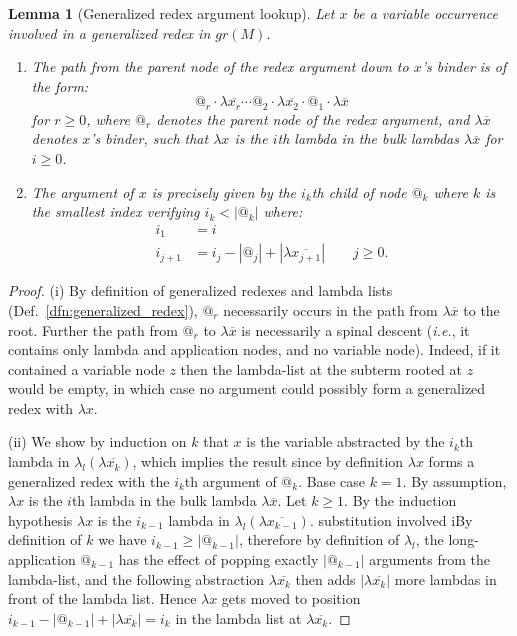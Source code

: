 \documentclass{article}
\makeatletter
\theoremstyle{plain}
\newtheorem{lemma}[theorem]{Lemma}
\theoremstyle{definition}
\theoremstyle{remark}
\newcommand\Nodes{\mathcal{N}}%
\newcommand\NodesApp{\Nodes_@}%
\renewcommand\ie{{\it i.e.\@\xspace}}
\makeatother
\begin{document}
\begin{lemma}[Generalized redex argument lookup]
\label{lemma:genredex_lookup}
Let $x$ be a variable occurrence involved in a generalized redex in $gr(M)$.
\begin{enumerate}[label=(\roman*)]
    \item The path from the parent node of the redex argument down to $x$'s binder is of the form:
$$ @_r \cdot \lambda\overline{x_r} \cdots
@_2 \cdot \lambda\overline{x_2} \cdot @_1 \cdot \lambda\overline{x}$$
for $r\geq0$, where $@_r$ denotes the parent node of the redex argument, and $\lambda\overline{x}$ denotes $x$'s binder, such that $\lambda x$ is the $i$th lambda in the bulk lambdas $\lambda\overline{x}$ for $i\geq0$.

\item The argument of $x$ is precisely given by the $i_k$th child of node $@_k$ where $k$ is the smallest index verifying $i_k<|@_k|$ where:
\begin{align*}
    i_1 &= i \\
    i_{j+1} &= i_j - |@_j| + |\lambda\overline{x_{j+1}}| \qquad j\geq 0 .
\end{align*}
\end{enumerate}
\end{lemma}
\begin{proof}
(i) By definition of generalized redexes and lambda lists (Def.~\ref{dfn:generalized_redex}), $@_r$ necessarily occurs in the path from $\lambda\overline{x}$ to the root. Further the path from $@_r$ to $\lambda\overline{x}$ is necessarily a spinal descent (\ie, it contains only lambda and application nodes, and no variable node). Indeed, if it contained a variable node $z$ then the lambda-list at the subterm rooted at $z$ would be empty, in which case no argument could possibly form a generalized redex with $\lambda x$.

(ii) We show by induction on $k$ that $x$ is the variable abstracted by the $i_k$th lambda in $\lambda_l(\lambda\overline{x_k})$, which implies the result since by definition $\lambda x$ forms a generalized redex with the $i_k$th argument of $@_k$.
Base case $k=1$. By assumption, $\lambda x$ is the $i$th lambda in the bulk lambda $\lambda\overline{x}$. Let $k\geq 1$. By the induction hypothesis $\lambda x$ is the $i_{k-1}$ lambda in $\lambda_l(\lambda\overline{x_{k-1}})$.
substitution involved iBy definition of $k$ we have $i_{k-1}\geq|@_{k-1}|$, therefore by definition of $\lambda_l$, the long-application $@_{k-1}$ has the effect of popping exactly $|@_{k-1}|$ arguments from the lambda-list, and the following abstraction $\lambda\overline{x_k}$ then adds $|\lambda\overline{x_k}|$ more lambdas in front of the lambda list. Hence $\lambda x$ gets moved to position $i_{k-1} - |@_{k-1}| + |\lambda\overline{x_k}| = i_k$ in the lambda list at $\lambda\overline{x_k}$.
\end{proof}
\end{document}
